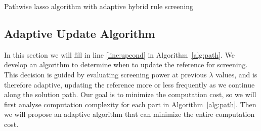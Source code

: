 \begin{algorithm}[ht]
  \label{alg:path}
    \SetAlgoLined
    \BlankLine
    
    \caption{Pathwise lasso algorithm with adaptive hybrid rule screening}
\end{algorithm}

\subsection{Adaptive Update Algorithm}
\label{sec:adaptive}

In this section we will fill in line \ref{line:upcond} in Algorithm~\ref{alg:path}. We develop an algorithm to determine when to update the reference for screening. This decision is guided by evaluating screening power at previous $\lambda$ values, and is therefore adaptive, updating the reference more or less frequently as we continue along the solution path. Our goal is to minimize the computation cost, so we will first analyse computation complexity for each part in Algorithm~\ref{alg:path}. Then we will propose an adaptive algorithm that can minimize the entire computation cost.

